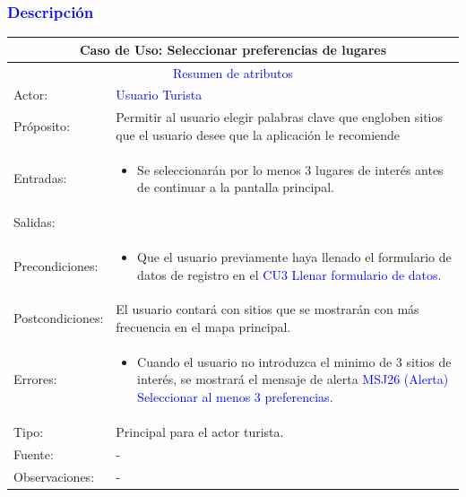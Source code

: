 \subsubsection{\textcolor{blue}{Descripción}}
\begin{tabularx}{16cm}{||l|X||}
	\hline
	\multicolumn{2}{||c||}{Caso de Uso: Seleccionar preferencias de lugares }  \\
	\hline
	\multicolumn{2}{||c||}{\textcolor{blue}{Resumen de atributos}} \\
	\hline
	{Actor:} & {\textcolor{blue}{Usuario Turista}} \\
	\hline
	{Próposito:} & {Permitir al usuario elegir palabras clave que engloben sitios que el usuario desee que la aplicación le recomiende} \\
	\hline
	{Entradas:} & {\begin{itemize}
            \item  Se seleccionarán por lo menos 3 lugares de interés antes de continuar a la pantalla principal.
        \end{itemize}}\\
	\hline
	{Salidas:} & {\begin{itemize}

        \end{itemize}}\\
	\hline
	{Precondiciones:} & { \begin{itemize}
            \item  Que el usuario previamente haya llenado el formulario de datos de registro en el {\textcolor{blue}{CU3 Llenar formulario de datos}}.
        \end{itemize}}\\ 
	\hline
	{Postcondiciones:} & {El usuario contará con sitios que se mostrarán con más frecuencia en el mapa principal.}\\
	\hline
	{Errores:} & \begin{itemize}
            \item Cuando el usuario no introduzca el minimo de 3 sitios de interés, se mostrará el mensaje de alerta {\textcolor{blue}{MSJ26 (Alerta) Seleccionar al menos 3 preferencias}}.
        \end{itemize} \\
	\hline
	{Tipo:} & {Principal para el actor turista.}\\
	\hline
	{Fuente:} & {-} \\
	\hline
	{Observaciones:} & {-} \\
	\hline
\end{tabularx}


